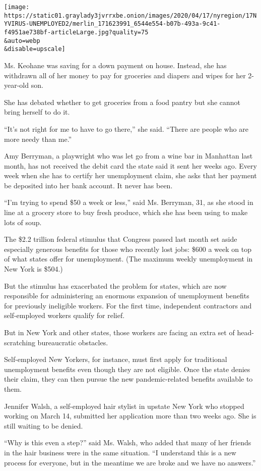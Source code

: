 \texttt{[image: https://static01.graylady3jvrrxbe.onion/images/2020/04/17/nyregion/17NYVIRUS-UNEMPLOYED2/merlin\_171623991\_6544e554-b07b-493a-9c41-f4951ae738bf-articleLarge.jpg?quality=75\\\&auto=webp\\\&disable=upscale]}

Ms. Keohane was saving for a down payment on house. Instead, she has
withdrawn all of her money to pay for groceries and diapers and wipes
for her 2-year-old son.

She has debated whether to get groceries from a food pantry but she
cannot bring herself to do it.

``It's not right for me to have to go there,'' she said. ``There are
people who are more needy than me.''

Amy Berryman, a playwright who was let go from a wine bar in Manhattan
last month, has not received the debit card the state said it sent her
weeks ago. Every week when she has to certify her unemployment claim,
she asks that her payment be deposited into her bank account. It never
has been.

``I'm trying to spend \$50 a week or less,'' said Ms. Berryman, 31, as
she stood in line at a grocery store to buy fresh produce, which she has
been using to make lots of soup.

The \$2.2 trillion federal stimulus that Congress passed last month set
aside especially generous benefits for those who recently lost jobs:
\$600 a week on top of what states offer for unemployment. (The maximum
weekly unemployment in New York is \$504.)

But the stimulus has exacerbated the problem for states, which are now
responsible for administering an enormous expansion of unemployment
benefits for previously ineligible workers. For the first time,
independent contractors and self-employed workers qualify for relief.

But in New York and other states, those workers are facing an extra set
of head-scratching bureaucratic obstacles.

Self-employed New Yorkers, for instance, must first apply for
traditional unemployment benefits even though they are not eligible.
Once the state denies their claim, they can then pursue the new
pandemic-related benefits available to them.

Jennifer Walsh, a self-employed hair stylist in upstate New York who
stopped working on March 14, submitted her application more than two
weeks ago. She is still waiting to be denied.

``Why is this even a step?'' said Ms. Walsh, who added that many of her
friends in the hair business were in the same situation. ``I understand
this is a new process for everyone, but in the meantime we are broke and
we have no answers.''

